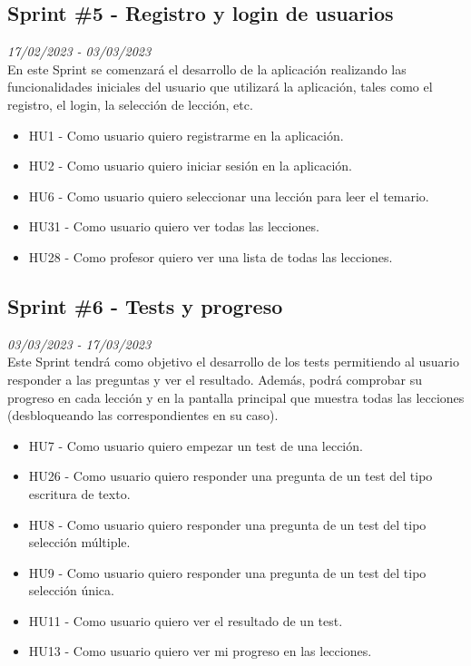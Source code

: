 \subsection{Sprint \#5 - Registro y login de usuarios}
\textit{17/02/2023   -   03/03/2023}\\

En este Sprint se comenzará el desarrollo de la aplicación realizando las funcionalidades iniciales del usuario
que utilizará la aplicación, tales como el registro, el login, la selección de lección, etc.
\begin{itemize}
    \item HU1 - Como usuario quiero registrarme en la aplicación.
    \item HU2 - Como usuario quiero iniciar sesión en la aplicación.
    \item HU6 - Como usuario quiero seleccionar una lección para leer el temario.
    \item HU31 - Como usuario quiero ver todas las lecciones.
    \item HU28 - Como profesor quiero ver una lista de todas las lecciones.
\end{itemize}


\subsection{Sprint \#6 - Tests y progreso}
\textit{03/03/2023   -   17/03/2023}\\

Este Sprint tendrá como objetivo el desarrollo de los tests permitiendo al usuario responder a las preguntas y ver el resultado.
Además, podrá comprobar su progreso en cada lección y en la pantalla principal que muestra todas las lecciones (desbloqueando las correspondientes en su caso).
\begin{itemize}
    \item HU7 - Como usuario quiero empezar un test de una lección.
    \item HU26 - Como usuario quiero responder una pregunta de un test del tipo escritura de texto.
    \item HU8 - Como usuario quiero responder una pregunta de un test del tipo selección múltiple.
    \item HU9 - Como usuario quiero responder una pregunta de un test del tipo selección única.
    \item HU11 - Como usuario quiero ver el resultado de un test.
    \item HU13 - Como usuario quiero ver mi progreso en las lecciones.

\end{itemize}

